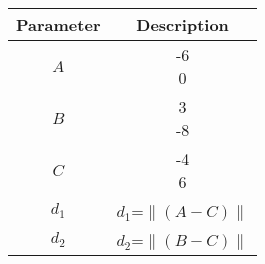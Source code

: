 \begin{tabular}{|c|c|}
        \hline
        Parameter & Description\\
        \hline
        $A$ & \myvec{-6\\0}\\
        \hline
        $B$ & \myvec{3\\-8}\\
        \hline
        $C$ & \myvec{-4\\6}\\
        \hline
        $d_1$ & $d_1$=\(\left\|{(A-C)}\right\|\)\\
        \hline
        $d_2$ & $d_2$=\(\left\|{(B-C)}\right\|\)\\
        \hline
\end{tabular}
